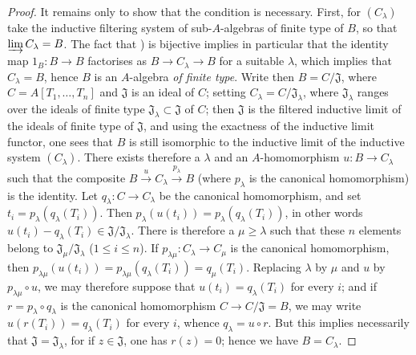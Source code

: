 \begin{proof}
It remains only to show that the condition is necessary.
First, for $(C_\lambda)$ take the inductive filtering system of sub-$A$-algebras of finite type of $B$, so that $\varinjlim C_\lambda=B$.
The fact that ) is bijective implies in particular that the identity map $1_B:B\to B$ factorises as $B\to C_\lambda\to B$ for a suitable $\lambda$, which implies that $C_\lambda=B$, hence $B$ is an $A$-algebra \emph{of finite type}.
Write then $B=C/\mathfrak{J}$, where $C=A[T_1,\ldots,T_n]$ and $\mathfrak{J}$ is an ideal of $C$; setting $C_\lambda=C/\mathfrak{J}_\lambda$, where $\mathfrak{J}_\lambda$ ranges over the ideals of finite type $\mathfrak{J}_\lambda\subset\mathfrak{J}$ of $C$; then $\mathfrak{J}$ is the filtered inductive limit of the ideals of finite type of $\mathfrak{J}$, and using the exactness of the inductive limit functor, one sees that $B$ is still isomorphic to the inductive limit of the inductive system $(C_\lambda)$.
There exists therefore a $\lambda$ and an $A$-homomorphism $u:B\to C_\lambda$ such that the composite $B\xrightarrow{u}C_\lambda\xrightarrow{p_\lambda}B$ (where $p_\lambda$ is the canonical homomorphism) is the identity.
Let $q_\lambda:C\to C_\lambda$ be the canonical homomorphism, and set
$t_i=p_\lambda(q_\lambda(T_i))$.
Then $p_\lambda(u(t_i))=p_\lambda(q_\lambda(T_i))$, in other words
$u(t_i)-q_\lambda(T_i)\in\mathfrak{J}/\mathfrak{J}_\lambda$.
There is therefore a $\mu\geqslant\lambda$ such that these $n$ elements belong to
$\mathfrak{J}_\mu/\mathfrak{J}_\lambda$ ($1\leqslant i\leqslant n$).
If $p_{\lambda\mu}:C_\lambda\to C_\mu$ is the canonical homomorphism, then
$p_{\lambda\mu}(u(t_i))=p_{\lambda\mu}(q_\lambda(T_i))=q_\mu(T_i)$.
Replacing $\lambda$ by $\mu$ and $u$ by $p_{\lambda\mu}\circ u$, we may therefore
suppose that $u(t_i)=q_\lambda(T_i)$ for every $i$; and if
$r=p_\lambda\circ q_\lambda$ is the canonical homomorphism
$C\to C/\mathfrak{J}=B$, we may write $u(r(T_i))=q_\lambda(T_i)$ for every $i$,
whence $q_\lambda=u\circ r$.
But this implies necessarily that $\mathfrak{J}=\mathfrak{J}_\lambda$, for if $z\in\mathfrak{J}$, one has $r(z)=0$; hence we have $B=C_\lambda$.


\end{proof}
